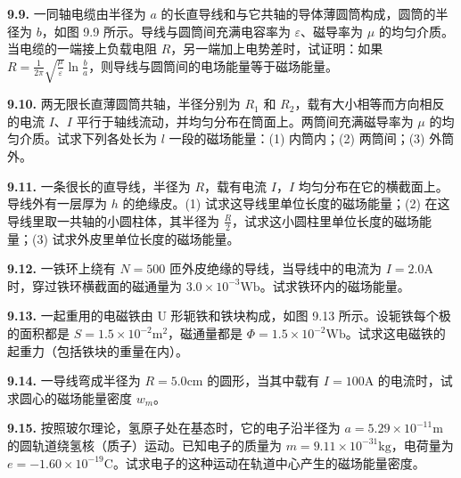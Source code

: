 \vfill
\newpage

\textbf{9.9.} 一同轴电缆由半径为 $a$ 的长直导线和与它共轴的导体薄圆筒构成，圆筒的半径为 $b$，如图 9.9 所示。导线与圆筒间充满电容率为 $\varepsilon$、磁导率为 $\mu$ 的均匀介质。当电缆的一端接上负载电阻 $R$，另一端加上电势差时，试证明：如果 $\displaystyle R = \frac{1}{2\pi} \sqrt{\frac{\mu}{\varepsilon}} \ln \frac{b}{a}$，则导线与圆筒间的电场能量等于磁场能量。

\begin{center}
\end{center}

\vfill
\newpage

\textbf{9.10.} 两无限长直薄圆筒共轴，半径分别为 $R_{1}$ 和 $R_{2}$，载有大小相等而方向相反的电流 $I$、$I$ 平行于轴线流动，并均匀分布在筒面上。两筒间充满磁导率为 $\mu$ 的均匀介质。试求下列各处长为 $l$ 一段的磁场能量：(1) 内筒内；(2) 两筒间；(3) 外筒外。

\vfill
\newpage

\textbf{9.11.} 一条很长的直导线，半径为 $R$，载有电流 $I$，$I$ 均匀分布在它的横截面上。导线外有一层厚为 $h$ 的绝缘皮。(1) 试求这导线里单位长度的磁场能量；(2) 在这导线里取一共轴的小圆柱体，其半径为 $\displaystyle \frac{R}{2}$，试求这小圆柱里单位长度的磁场能量；(3) 试求外皮里单位长度的磁场能量。

\vfill
\newpage

\textbf{9.12.} 一铁环上绕有 $N = 500$ 匝外皮绝缘的导线，当导线中的电流为 $I = 2.0\mathrm{A}$ 时，穿过铁环横截面的磁通量为 $3.0 \times 10^{-3}\mathrm{Wb}$。试求铁环内的磁场能量。

\vfill
\newpage

\textbf{9.13.} 一起重用的电磁铁由 U 形轭铁和铁块构成，如图 9.13 所示。设轭铁每个极的面积都是 $S = 1.5 \times 10^{-2}\mathrm{m}^2$，磁通量都是 $\Phi = 1.5 \times 10^{-2}\mathrm{Wb}$。试求这电磁铁的起重力（包括铁块的重量在内）。

\begin{center}
\end{center}

\vfill
\newpage

\textbf{9.14.} 一导线弯成半径为 $R = 5.0\mathrm{cm}$ 的圆形，当其中载有 $I = 100\mathrm{A}$ 的电流时，试求圆心的磁场能量密度 $w_{m}$。

\vfill
\newpage

\textbf{9.15.} 按照玻尔理论，氢原子处在基态时，它的电子沿半径为 $a = 5.29 \times 10^{-11}\mathrm{m}$ 的圆轨道绕氢核（质子）运动。已知电子的质量为 $m = 9.11 \times 10^{-31}\mathrm{kg}$，电荷量为 $e = -1.60 \times 10^{-19}\mathrm{C}$。试求电子的这种运动在轨道中心产生的磁场能量密度。

